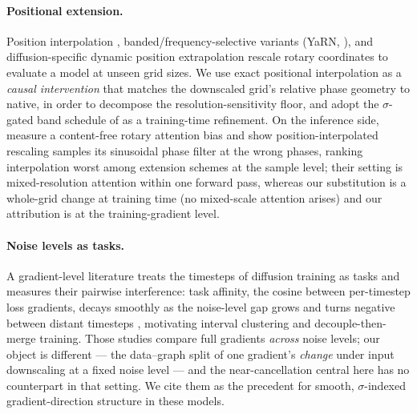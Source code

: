 \paragraph{Positional extension.}
Position interpolation \citep{chen2023pi}, banded/frequency-selective
variants (YaRN, \citealp{peng2024yarn}), and diffusion-specific dynamic
position extrapolation \citep{issachar2025dype,zhao2026sigma} rescale
rotary coordinates to evaluate a model at unseen grid sizes. We use
exact positional interpolation as a \emph{causal intervention} that
matches the downscaled grid's relative phase geometry to native, in
order to decompose the resolution-sensitivity floor, and adopt the
$\sigma$-gated band schedule of \citet{zhao2026sigma} as a
training-time refinement. On the inference side,
\citet{wu2025phasealigned} measure a content-free rotary attention
bias and show position-interpolated rescaling samples its sinusoidal
phase filter at the wrong phases, ranking interpolation worst among
extension schemes at the sample level; their setting is
mixed-resolution attention within one forward pass, whereas our
substitution is a whole-grid change at training time (no mixed-scale
attention arises) and our attribution is at the training-gradient
level.

\paragraph{Noise levels as tasks.}
A gradient-level literature treats the timesteps of diffusion
training as tasks and measures their pairwise interference: task
affinity, the cosine between per-timestep loss gradients, decays
smoothly as the noise-level gap grows \citep{go2023ant} and turns
negative between distant timesteps \citep{ma2025deme}, motivating
interval clustering and decouple-then-merge training. Those studies
compare full gradients \emph{across} noise levels; our object is
different --- the data--graph split of one gradient's \emph{change}
under input downscaling at a fixed noise level --- and the
near-cancellation central here has no counterpart in that setting.
We cite them as the precedent for smooth, $\sigma$-indexed
gradient-direction structure in these models.
